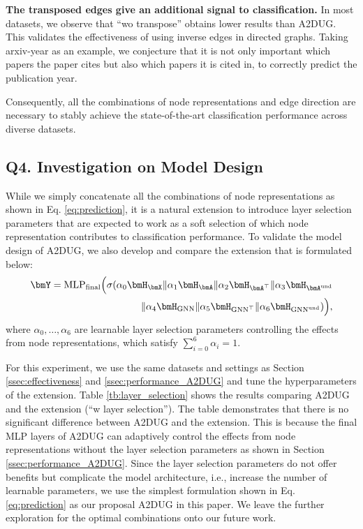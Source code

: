 \smallskip \noindent \textbf{The transposed edges give an additional signal to classification. }
In most datasets, we observe that ``wo transpose'' obtains lower results than A2DUG.
This validates the effectiveness of using inverse edges in directed graphs.
Taking arxiv-year as an example, we conjecture that it is not only important which papers the paper cites but also which papers it is cited in, to correctly predict the publication year.

Consequently, all the combinations of node representations and edge direction are necessary to stably achieve the state-of-the-art classification performance across diverse datasets. 


\subsection{Q4. Investigation on Model Design}
\label{ssec:model_validity}
While we simply concatenate all the combinations of node representations as shown in Eq. \eqref{eq:prediction}, it is a natural extension to introduce layer selection parameters that are expected to work as a soft selection of which node representation contributes to classification performance.
To validate the model design of A2DUG, we also develop and compare the extension that is formulated below:
\begin{align}
\label{eq:attention}
    \bmY = \text{MLP}_\text{final}\Bigl(\sigma(\alpha_0\bmH_{\bmX}\|\alpha_1\bmH_{\bmA}\|\alpha_2\bmH_{\bmA^{\top}}\|\alpha_3\bmH_{\bmA^\text{und}}\nonumber\\ 
    \|\alpha_4\bmH_\text{GNN}\|\alpha_5\bmH_{\text{GNN}^{\top}}\|\alpha_6\bmH_{\text{GNN}^\text{und}})\Bigr),
\end{align}
where $\alpha_0, \dots, \alpha_6$ are learnable layer selection parameters controlling the effects from node representations, which satisfy $\sum_{i=0}^6\alpha_i=1$. 

For this experiment, we use the same datasets and settings as Section \ref{ssec:effectiveness} and \ref{ssec:performance_A2DUG} and tune the hyperparameters of the extension. 
Table \ref{tb:layer_selection} shows the results comparing A2DUG and the extension (``w layer selection'').
The table demonstrates that there is no significant difference between A2DUG and the extension. 
This is because the final MLP layers of A2DUG can adaptively control the effects from node representations without the layer selection parameters as shown in Section \ref{ssec:performance_A2DUG}. 
Since the layer selection parameters do not offer benefits but complicate the model architecture, i.e., increase the number of learnable parameters, we use the simplest formulation shown in Eq. \eqref{eq:prediction} as our proposal A2DUG in this paper.
We leave the further exploration for the optimal combinations onto our future work.
